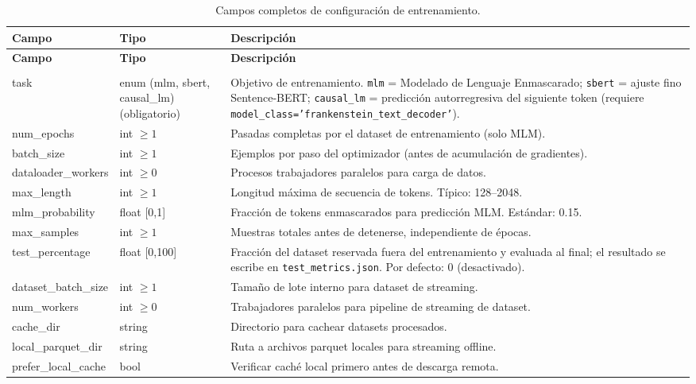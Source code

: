 \begin{longtable}{>{\ttfamily\footnotesize\raggedright\arraybackslash}p{5.6cm}>{\raggedright\arraybackslash}p{2.4cm}>{\raggedright\arraybackslash}p{6.9cm}}
\toprule
\textbf{Campo} & \textbf{Tipo} & \textbf{Descripción} \\
\midrule
\endfirsthead
\toprule
\textbf{Campo} & \textbf{Tipo} & \textbf{Descripción} \\
\midrule
\endhead
\midrule
\multicolumn{3}{r}{\textit{continúa en la página siguiente}} \\
\endfoot
\bottomrule
\caption{Campos completos de configuración de entrenamiento.}
\label{tab:training-fields}
\endlastfoot
task & enum (mlm, sbert, causal\_lm) (obligatorio) & Objetivo de entrenamiento. \texttt{mlm} = Modelado de Lenguaje Enmascarado; \texttt{sbert} = ajuste fino Sentence-BERT; \texttt{causal\_lm} = predicción autorregresiva del siguiente token (requiere \texttt{model\_class='frankenstein\_text\_decoder'}). \\
num\_epochs & int $\ge 1$ & Pasadas completas por el dataset de entrenamiento (solo MLM). \\
batch\_size & int $\ge 1$ & Ejemplos por paso del optimizador (antes de acumulación de gradientes). \\
dataloader\_workers & int $\ge 0$ & Procesos trabajadores paralelos para carga de datos. \\
max\_length & int $\ge 1$ & Longitud máxima de secuencia de tokens. Típico: 128--2048. \\
mlm\_probability & float [0,1] & Fracción de tokens enmascarados para predicción MLM. Estándar: 0.15. \\
max\_samples & int $\ge 1$ & Muestras totales antes de detenerse, independiente de épocas. \\
test\_percentage & float [0,100] & Fracción del dataset reservada fuera del entrenamiento y evaluada al final; el resultado se escribe en \texttt{test\_metrics.json}. Por defecto: 0 (desactivado). \\
dataset\_batch\_size & int $\ge 1$ & Tamaño de lote interno para dataset de streaming. \\
num\_workers & int $\ge 0$ & Trabajadores paralelos para pipeline de streaming de dataset. \\
cache\_dir & string & Directorio para cachear datasets procesados. \\
local\_parquet\_dir & string & Ruta a archivos parquet locales para streaming offline. \\
prefer\_local\_cache & bool & Verificar caché local primero antes de descarga remota. \\

\end{longtable}
